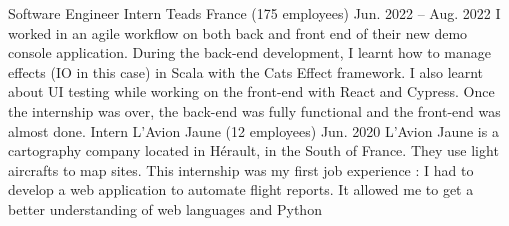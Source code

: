 \documentclass[11pt]{spidercv}
\begin{document}
\begin{MainPart}
  \Experience
  {\ColorHighlight}
  {Software Engineer Intern}
  {Teads France (175 employees)}
  {Jun. 2022 -- Aug. 2022}{
    I worked in an agile workflow on both back and front end of their new demo console application. During the back-end development, I learnt how to manage effects (IO in this case) in Scala with the Cats Effect framework. I also learnt about UI testing while working on the front-end with React and Cypress. Once the internship was over, the back-end was fully functional and the front-end was almost done.
  }
  \Experience
  {\ColorHighlight}
  {Intern}
  {L'Avion Jaune (12 employees)}
  {Jun. 2020}
  {
    L'Avion Jaune is a cartography company located in Hérault, in the South of France. They use light aircrafts to map sites. This internship was my first job experience : I had to develop a web application to automate flight reports. It allowed me to get a better understanding of web languages and Python
  }

\end{MainPart}
\end{document}
